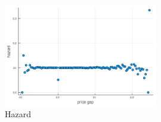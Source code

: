 \begin{figure}
    \centering
    \includegraphics[width = 0.6\textwidth]{../tasks/Calvo_Plus/output/hazard_cp.png}
    \caption{Hazard}
    \label{}
\end{figure}
